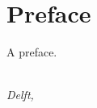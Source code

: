 \chapter*{Preface}

A preface.

\begin{flushright}
{\makeatletter\itshape
    \ifdefvoid{\@author@short}{\@author}{\@author@short} \\
    Delft, \monthname{} \the\year{}
\makeatother}
\end{flushright}
